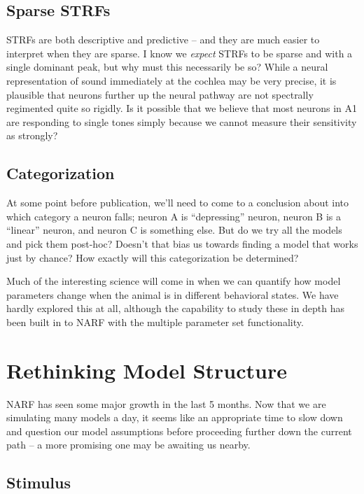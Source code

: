 \documentclass[11pt]{article}
\begin{document}
\subsection{Sparse STRFs}
\label{sec-1.2}


   STRFs are both descriptive and predictive -- and they are much easier to interpret when they are sparse. I know we \emph{expect} STRFs to be sparse and with a single dominant peak, but why must this necessarily be so? While a neural representation of sound immediately at the cochlea may be very precise, it is plausible that neurons further up the neural pathway are not spectrally regimented quite so rigidly. Is it possible that we believe that most neurons in A1 are responding to single tones simply because we cannot measure their sensitivity as strongly?

\subsection{Categorization}
\label{sec-1.3}


   At some point before publication, we'll need to come to a conclusion about into which category a neuron falls; neuron A is ``depressing'' neuron, neuron B is a ``linear'' neuron, and neuron C is something else. But do we try all the models and pick them post-hoc? Doesn't that bias us towards finding a model that works just by chance? How exactly will this categorization be determined?

   Much of the interesting science will come in when we can quantify how model parameters change when the animal is in different behavioral states. We have hardly explored this at all, although the capability to study these in depth has been built in to NARF with the multiple parameter set functionality. 

\section{Rethinking Model Structure}
\label{sec-2}


  NARF has seen some major growth in the last 5 months. Now that we are simulating many models a day, it seems like an appropriate time to slow down and question our model assumptions before proceeding further down the current path -- a more promising one may be awaiting us nearby. 

\subsection{Stimulus}
\label{sec-2.1}
\end{document}
